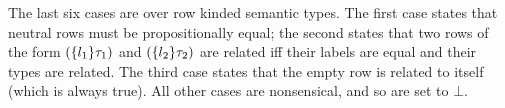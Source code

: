 \documentclass[authoryear, acmsmall, screen, review, nonacm]{acmart}
\begin{document}
The last six cases are over row kinded semantic types. The first case states that neutral rows must be propositionally equal; the second states that two rows of the form $(\{l_1\} {\tau_1})$ and $(\{l_2\} {\tau_2})$ are related iff their labels are equal and their types are related. The third case states that the empty row is related to itself (which is always true). All other cases are nonsensical, and so are set to $\bot$.

\begin{code}%
\>[0]\AgdaSpace{}%
\AgdaSymbol{\{}\AgdaSpace{}%
\AgdaSymbol{=}\AgdaSpace{}%
\AgdaOperator{\AgdaInductiveConstructor{R[}}\AgdaSpace{}%
\AgdaSpace{}%
\AgdaOperator{\AgdaInductiveConstructor{]}}\AgdaSymbol{\}}\AgdaSpace{}%
\AgdaSymbol{(}\AgdaSpace{}%
\AgdaSymbol{(}\AgdaSpace{}%
\AgdaSymbol{))}\AgdaSpace{}%
\AgdaSymbol{(}\AgdaSpace{}%
\AgdaSymbol{(}\AgdaSpace{}%
\AgdaSymbol{))}%
\>[67]\AgdaSymbol{=}\AgdaSpace{}%
\AgdaSpace{}%
\AgdaSpace{}%
\<%
\\
\>[0]\AgdaSpace{}%
\AgdaSymbol{\{}\AgdaSpace{}%
\AgdaSymbol{=}\AgdaSpace{}%
\AgdaOperator{\AgdaInductiveConstructor{R[}}\AgdaSpace{}%
\AgdaSpace{}%
\AgdaOperator{\AgdaInductiveConstructor{]}}\AgdaSymbol{\}}\AgdaSpace{}%
\AgdaSymbol{(}\AgdaSpace{}%
\AgdaSymbol{(}\AgdaSpace{}%
\AgdaSymbol{(}\AgdaSpace{}%
\AgdaOperator{\AgdaInductiveConstructor{,}}\AgdaSpace{}%
\AgdaSymbol{)))}\AgdaSpace{}%
\AgdaSymbol{(}\AgdaSpace{}%
\AgdaSymbol{(}\AgdaSpace{}%
\AgdaSymbol{(}\AgdaSpace{}%
\AgdaOperator{\AgdaInductiveConstructor{,}}\AgdaSpace{}%
\AgdaSymbol{)))}\AgdaSpace{}%
\AgdaSymbol{=}\AgdaSpace{}%
\AgdaSpace{}%
\AgdaSpace{}%
\AgdaSpace{}%
\AgdaSpace{}%
\AgdaSpace{}%
\AgdaSpace{}%
\<%
\\
\>[0]\AgdaSpace{}%
\AgdaSymbol{\{}\AgdaSpace{}%
\AgdaSymbol{=}\AgdaSpace{}%

\end{code}
\end{document}
